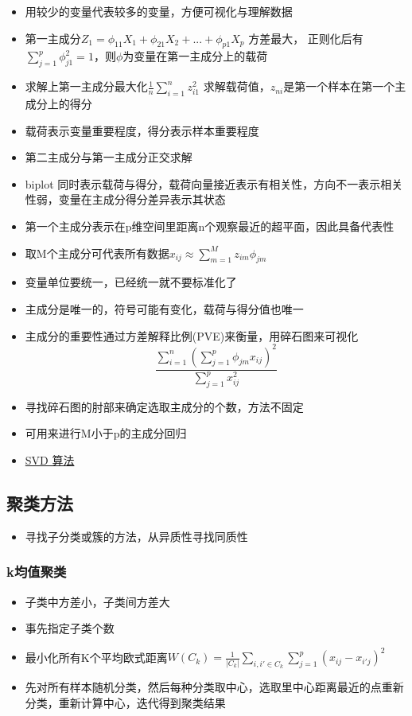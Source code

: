 \documentclass[]{book}
\providecommand{\tightlist}{%
  \setlength{\itemsep}{0pt}\setlength{\parskip}{0pt}}
\begin{document}
\begin{itemize}
\tightlist
\item
  用较少的变量代表较多的变量，方便可视化与理解数据
\item
  第一主成分\(Z_1 = \phi_{11} X_1 + \phi_{21}X_2 + ... + \phi_{p1} X_p\) 方差最大， 正则化后有\(\sum_{j = 1}^p \phi_{j1}^2 = 1\)，则\(\phi\)为变量在第一主成分上的载荷
\item
  求解上第一主成分最大化\(\frac{1}{n} \sum_{i = 1}^{n} z_{i1}^2\) 求解载荷值，\(z_{ni}\)是第一个样本在第一个主成分上的得分
\item
  载荷表示变量重要程度，得分表示样本重要程度
\item
  第二主成分与第一主成分正交求解
\item
  biplot 同时表示载荷与得分，载荷向量接近表示有相关性，方向不一表示相关性弱，变量在主成分得分差异表示其状态
\item
  第一个主成分表示在p维空间里距离n个观察最近的超平面，因此具备代表性
\item
  取M个主成分可代表所有数据\(x_{ij} \approx \sum_{m = 1}^M z_{im} \phi_{jm}\)
\item
  变量单位要统一，已经统一就不要标准化了
\item
  主成分是唯一的，符号可能有变化，载荷与得分值也唯一
\item
  主成分的重要性通过方差解释比例(PVE)来衡量，用碎石图来可视化\[\frac{\sum_{i = 1}^n (\sum_{j =1}^p \phi_{jm} x_{ij})^2}{\sum_{j =1}^p x_{ij}^2}\]
\item
  寻找碎石图的肘部来确定选取主成分的个数，方法不固定
\item
  可用来进行M小于p的主成分回归
\item
  \href{https://github.com/j2kun/svd}{SVD 算法}
\end{itemize}

\subsection{聚类方法}

\begin{itemize}
\tightlist
\item
  寻找子分类或簇的方法，从异质性寻找同质性
\end{itemize}

\hypertarget{k}{%
\subsubsection{k均值聚类}\label{k}}

\begin{itemize}
\tightlist
\item
  子类中方差小，子类间方差大
\item
  事先指定子类个数
\item
  最小化所有K个平均欧式距离\(W(C_k) = \frac{1}{|C_k|} \sum_{i,i' \in C_k} \sum_{j = 1}^{p} (x_{ij} - x_{i'j})^2\)
\item
  先对所有样本随机分类，然后每种分类取中心，选取里中心距离最近的点重新分类，重新计算中心，迭代得到聚类结果
\end{itemize}
\end{document}
